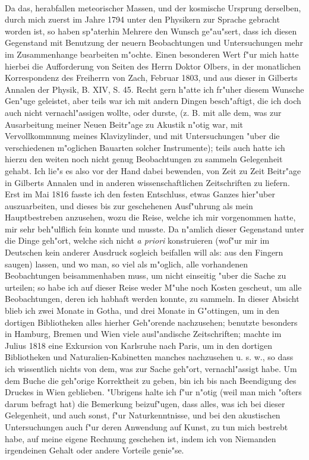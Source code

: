 \documentclass[a4paper, 11pt, oneside, polutonikogreek, german]{article}
\begin{document}
\paragraph{}
Da das, herabfallen meteorischer Massen, und der kosmische Ursprung derselben, durch mich zuerst im Jahre 1794 unter den Physikern zur Sprache gebracht worden ist, so haben sp"aterhin Mehrere den Wunsch ge"au"sert, dass ich diesen Gegenstand mit Benutzung der neuern Beobachtungen und Untersuchungen mehr im Zusammenhange bearbeiten m"ochte. Einen besonderen Wert f"ur mich hatte hierbei die Aufforderung von Seiten des Herrn Doktor Olbers, in der monatlichen Korrespondenz des Freiherrn von Zach, Februar 1803, und aus dieser in Gilberts Annalen der Physik, B. XIV, S. 45. Recht gern h"atte ich fr"uher diesem Wunsche Gen"uge geleistet, aber teils war ich mit andern Dingen besch"aftigt, die ich doch auch nicht vernachl"assigen wollte, oder durste, (z. B. mit alle dem, was zur Ausarbeitung meiner Neuen Beitr"age zu Akustik n"otig war, mit Vervollkommnung meines Klavizylinder, und mit Untersuchungen "uber die verschiedenen m"oglichen Bauarten solcher Instrumente); teils auch hatte ich hierzu den weiten noch nicht genug Beobachtungen zu sammeln Gelegenheit gehabt. Ich lie"s es also vor der Hand dabei bewenden, von Zeit zu Zeit Beitr"age in Gilberts Annalen und in anderen wissenschaftlichen Zeitschriften zu liefern. Erst im Mai 1816 fasste ich den festen Entschluss, etwas Ganzes hier"uber auszuarbeiten, und dieses bis zur geschehenen Ausf"uhrung als mein Hauptbestreben anzusehen, wozu die Reise, welche ich mir vorgenommen hatte, mir sehr beh"ulflich fein konnte und musste. Da n"amlich dieser Gegenstand unter die Dinge geh"ort, welche sich nicht \emph{a priori} konstruieren (wof"ur mir im Deutschen kein anderer Ausdruck sogleich beifallen will als: aus den Fingern saugen) lassen, und wo man, so viel als m"oglich, alle vorhandenen Beobachtungen beisammenhaben muss, um nicht einseitig "uber die Sache zu urteilen; so habe ich auf dieser Reise weder M"uhe noch Kosten gescheut, um alle Beobachtungen, deren ich habhaft werden konnte, zu sammeln. In dieser Absicht blieb ich zwei Monate in Gotha, und drei Monate in G"ottingen, um in den dortigen Bibliotheken alles hierher Geh"orende nachzusehen; benutzte besonders in Hamburg, Bremen und Wien viele ausl"andische Zeitschriften; machte im Julius 1818 eine Exkursion von Karlsruhe nach Paris, um in den dortigen Bibliotheken und Naturalien-Kabinetten manches nachzusehen u. s. w., so dass ich wissentlich nichts von dem, was zur Sache geh"ort, vernachl"assigt habe. Um dem Buche die geh"orige Korrektheit zu geben, bin ich bis nach Beendigung des Druckes in Wien geblieben. "Ubrigens halte ich f"ur n"otig (weil man mich "ofters darum befragt hat) die Bemerkung beizuf"ugen, dass alles, was ich bei dieser Gelegenheit, und auch sonst, f"ur Naturkenntnisse, und bei den akustischen Untersuchungen auch f"ur deren Anwendung auf Kunst, zu tun mich bestrebt habe, auf meine eigene Rechnung geschehen ist, indem ich von Niemanden irgendeinen Gehalt oder andere Vorteile genie"se.
\end{document}

